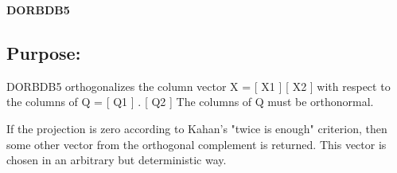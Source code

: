 {\bfseries D\+O\+R\+B\+D\+B5} 

\subsection*{Purpose\+: }

\begin{DoxyVerb} DORBDB5 orthogonalizes the column vector
      X = [ X1 ]
          [ X2 ]
 with respect to the columns of
      Q = [ Q1 ] .
          [ Q2 ]
 The columns of Q must be orthonormal.

 If the projection is zero according to Kahan's "twice is enough"
 criterion, then some other vector from the orthogonal complement
 is returned. This vector is chosen in an arbitrary but deterministic
 way.\end{DoxyVerb}
 
